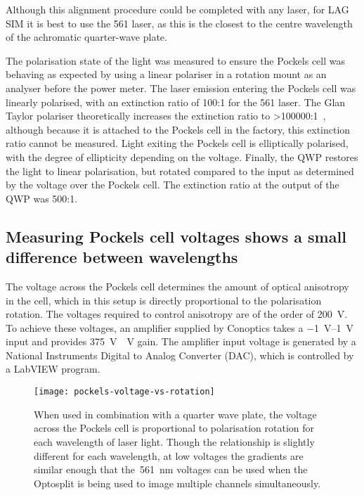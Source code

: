 Although this alignment procedure could be completed with any laser, for LAG SIM it is best to use the 561 laser, as this is the closest to the centre wavelength of the achromatic quarter-wave plate. 

The polarisation state of the light was measured to ensure the Pockels cell was behaving as expected by using a linear polariser in a rotation mount as an analyser before the power meter. 
The laser emission entering the Pockels cell was linearly polarised, with an extinction ratio of 100:1 for the 561 laser. 
The Glan Taylor polariser theoretically increases the extinction ratio to >\num{100000}:1~\cite{bennett1995handbook}, although because it is attached to the Pockels cell in the factory, this extinction ratio cannot be measured. 
Light exiting the Pockels cell is elliptically polarised, with the degree of ellipticity depending on the voltage. 
Finally, the QWP restores the light to linear polarisation, but rotated compared to the input as determined by the voltage over the Pockels cell.
The extinction ratio at the output of the QWP was 500:1. 

\subsection{Measuring Pockels cell voltages shows a small difference between wavelengths}
The voltage across the Pockels cell determines the amount of optical anisotropy in the cell, which in this setup is directly proportional to the polarisation rotation. 
The voltages required to control anisotropy are of the order of \SI{200}{\volt}. 
To achieve these voltages, an amplifier supplied by Conoptics takes a \SIrange{-1}{1}{\volt} input and provides \SI{375}{\volt\/\volt} gain. 
The amplifier input voltage is generated by a National Instruments Digital to Analog Converter (DAC), which is controlled by a LabVIEW program. 

\begin{figure}[htbp!]
\centering
\texttt{[image: pockels-voltage-vs-rotation]}
\caption[LAG SIM: A Pockels cell is used to rotate the polarisation of laser light for maximum SIM pattern contrast]{When used in combination with a quarter wave plate, the voltage across the Pockels cell is proportional to polarisation rotation for each wavelength of laser light. Though the relationship is slightly different for each wavelength, at low voltages the gradients are similar enough that the~\SI{561}{\nano\metre} voltages can be used when the Optosplit is being used to image multiple channels simultaneously.}
\label{fig:pockels-voltage-rotation}
\end{figure}

